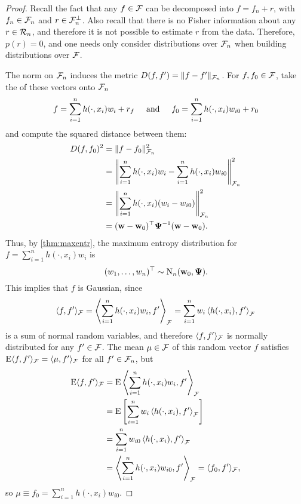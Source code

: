 \begin{proof}
  Recall the fact that any $f \in {\mathcal F}$ can be decomposed into $f = f_n + r$, with $f_n \in {\mathcal F}_n$ and $r \in {\mathcal F}_n^\bot$.
  Also recall that there is no Fisher information about any $r \in {\mathcal R}_n$, and therefore it is not possible to estimate $r$ from the data.
  Therefore, $p(r) = 0$, and one needs only consider distributions over ${\mathcal F}_n$ when building distributions over ${\mathcal F}$.
  
  The norm on ${\mathcal F}_n$ induces the metric $D(f,f') = \lVert f - f'\rVert_{{\mathcal F}_n}$.
  For $f,f_0 \in {\mathcal F}$, take the 
   of these vectors onto ${\mathcal F}_n$
  \vspace{-0.5em}
  \[
    f = \sum_{i=1}^n h(\cdot,x_i)w_i + r_f
    \hspace{0.5cm}\text{and}\hspace{0.5cm}
    f_0 = \sum_{i=1}^n h(\cdot,x_i)w_{i0} + r_0
    \vspace{-0.5em}
  \]
  and compute the squared distance between them:
  \begin{align*}
    D(f,f_0)^2 
    &= \lVert f - f_0\rVert_{{\mathcal F}_n}^2 \\
    &= \left\Vert \sum_{i=1}^n h(\cdot,x_i)w_i - \sum_{i=1}^n h(\cdot,x_i)w_{i0} \right\Vert_{{\mathcal F}_n}^2 \\
    &= \left\Vert \sum_{i=1}^n h(\cdot,x_i)(w_i - w_{i0}) \right\Vert_{{\mathcal F}_n}^2 \\
    &= ({\mathbf w} - {\mathbf w}_0)^\top{\bm\Psi}^{-1} ({\mathbf w} - {\mathbf w}_0).
  \end{align*}
  Thus, by \cref{thm:maxentr}, the maximum entropy distribution for $f = \sum_{i=1}^n h(\cdot,x_i)w_i$ is
  \[
    (w_1,\dots,w_n)^\top \sim \operatorname{N}_n({\mathbf w}_0,{\bm\Psi}).
  \]
  This implies that $f$ is Gaussian, since
  \begin{align*}
    \langle f,f' \rangle_{{\mathcal F}}
    = \left\langle \sum_{i=1}^n h(\cdot,x_i)w_i, f' \right\rangle_{{\mathcal F}} 
    = \sum_{i=1}^n w_i \left\langle  h(\cdot,x_i), f' \right\rangle_{{\mathcal F}}  
  \end{align*}
  is a sum of normal random variables, and therefore $\langle f,f' \rangle_{{\mathcal F}}$ is normally distributed for any $f' \in {\mathcal F}$.
  The mean $\mu\in{\mathcal F}$ of this random vector $f$ satisfies $\operatorname{E}\langle f,f'\rangle_{{\mathcal F}}  = \langle\mu,f'\rangle_{{\mathcal F}}$ for all $f'\in{\mathcal F}_n$, but
  \vspace{-1.1em}
  \begin{align*}
    \operatorname{E}\langle f,f'\rangle_{{\mathcal F}}  
    &= \operatorname{E} \left\langle \sum_{i=1}^n h(\cdot,x_i)w_i, f' \right\rangle_{{\mathcal F}} \\
    &= \operatorname{E} \left[ \sum_{i=1}^n w_i \left\langle  h(\cdot,x_i), f' \right\rangle_{{\mathcal F}} \right] \\
    &= \sum_{i=1}^n w_{i0} \left\langle  h(\cdot,x_i), f' \right\rangle_{{\mathcal F}}  \\
    &= \left\langle \sum_{i=1}^n h(\cdot,x_i)w_{i0}, f' \right\rangle_{{\mathcal F}} = \langle f_0,f' \rangle_{{\mathcal F}},
  \end{align*}
  so $\mu \equiv f_0 = \sum_{i=1}^n h(\cdot,x_i)w_{i0}$. 
  

\end{proof}
